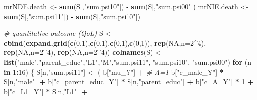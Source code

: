 \documentclass[
]{book}
\newenvironment{Shaded}{\begin{snugshade}}{\end{snugshade}}
\newcommand{\AttributeTok}[1]{\textcolor[rgb]{0.13,0.29,0.53}{#1}}
\newcommand{\CommentTok}[1]{\textcolor[rgb]{0.56,0.35,0.01}{\textit{#1}}}
\newcommand{\ConstantTok}[1]{\textcolor[rgb]{0.56,0.35,0.01}{#1}}
\newcommand{\ControlFlowTok}[1]{\textcolor[rgb]{0.13,0.29,0.53}{\textbf{#1}}}
\newcommand{\DecValTok}[1]{\textcolor[rgb]{0.00,0.00,0.81}{#1}}
\newcommand{\FunctionTok}[1]{\textcolor[rgb]{0.13,0.29,0.53}{\textbf{#1}}}
\newcommand{\NormalTok}[1]{#1}
\newcommand{\OtherTok}[1]{\textcolor[rgb]{0.56,0.35,0.01}{#1}}
\newcommand{\SpecialCharTok}[1]{\textcolor[rgb]{0.81,0.36,0.00}{\textbf{#1}}}
\newcommand{\StringTok}[1]{\textcolor[rgb]{0.31,0.60,0.02}{#1}}
\begin{document}
\begin{Shaded}
\begin{Highlighting}[]
\NormalTok{  mrNDE.death }\OtherTok{\textless{}{-}} \FunctionTok{sum}\NormalTok{(S[,}\StringTok{"sum.psi10"}\NormalTok{]) }\SpecialCharTok{{-}} \FunctionTok{sum}\NormalTok{(S[,}\StringTok{"sum.psi00"}\NormalTok{])}
\NormalTok{  mrNIE.death }\OtherTok{\textless{}{-}} \FunctionTok{sum}\NormalTok{(S[,}\StringTok{"sum.psi11"}\NormalTok{]) }\SpecialCharTok{{-}} \FunctionTok{sum}\NormalTok{(S[,}\StringTok{"sum.psi10"}\NormalTok{])}
  
  \CommentTok{\# quantitative outcome (QoL)}
\NormalTok{  S }\OtherTok{\textless{}{-}} \FunctionTok{cbind}\NormalTok{(}\FunctionTok{expand.grid}\NormalTok{(}\FunctionTok{c}\NormalTok{(}\DecValTok{0}\NormalTok{,}\DecValTok{1}\NormalTok{),}\FunctionTok{c}\NormalTok{(}\DecValTok{0}\NormalTok{,}\DecValTok{1}\NormalTok{),}\FunctionTok{c}\NormalTok{(}\DecValTok{0}\NormalTok{,}\DecValTok{1}\NormalTok{),}\FunctionTok{c}\NormalTok{(}\DecValTok{0}\NormalTok{,}\DecValTok{1}\NormalTok{)), }\FunctionTok{rep}\NormalTok{(}\ConstantTok{NA}\NormalTok{,}\AttributeTok{n=}\DecValTok{2}\SpecialCharTok{\^{}}\DecValTok{4}\NormalTok{), }
             \FunctionTok{rep}\NormalTok{(}\ConstantTok{NA}\NormalTok{,}\AttributeTok{n=}\DecValTok{2}\SpecialCharTok{\^{}}\DecValTok{4}\NormalTok{), }\FunctionTok{rep}\NormalTok{(}\ConstantTok{NA}\NormalTok{,}\AttributeTok{n=}\DecValTok{2}\SpecialCharTok{\^{}}\DecValTok{4}\NormalTok{))}
  \FunctionTok{colnames}\NormalTok{(S) }\OtherTok{\textless{}{-}} \FunctionTok{list}\NormalTok{(}\StringTok{"male"}\NormalTok{,}\StringTok{"parent\_educ"}\NormalTok{,}\StringTok{"L1"}\NormalTok{,}\StringTok{"M"}\NormalTok{,}\StringTok{"sum.psi11"}\NormalTok{, }\StringTok{"sum.psi10"}\NormalTok{, }
                      \StringTok{"sum.psi00"}\NormalTok{)}
  \ControlFlowTok{for}\NormalTok{ (n }\ControlFlowTok{in} \DecValTok{1}\SpecialCharTok{:}\DecValTok{16}\NormalTok{) \{}
\NormalTok{    S[n,}\StringTok{"sum.psi11"}\NormalTok{] }\OtherTok{\textless{}{-}}\NormalTok{  ( b[}\StringTok{"mu\_Y"}\NormalTok{] }\SpecialCharTok{+}                                          \CommentTok{\# A=1}
\NormalTok{                             b[}\StringTok{"c\_male\_Y"}\NormalTok{] }\SpecialCharTok{*}\NormalTok{ S[n,}\StringTok{"male"}\NormalTok{] }\SpecialCharTok{+} 
\NormalTok{                             b[}\StringTok{"c\_parent\_educ\_Y"}\NormalTok{] }\SpecialCharTok{*}\NormalTok{ S[n,}\StringTok{"parent\_educ"}\NormalTok{] }\SpecialCharTok{+} 
\NormalTok{                             b[}\StringTok{"c\_A\_Y"}\NormalTok{] }\SpecialCharTok{*} \DecValTok{1} \SpecialCharTok{+} 
\NormalTok{                             b[}\StringTok{"c\_L1\_Y"}\NormalTok{] }\SpecialCharTok{*}\NormalTok{ S[n,}\StringTok{"L1"}\NormalTok{] }\SpecialCharTok{+}

\end{Highlighting}
\end{Shaded}
\end{document}
